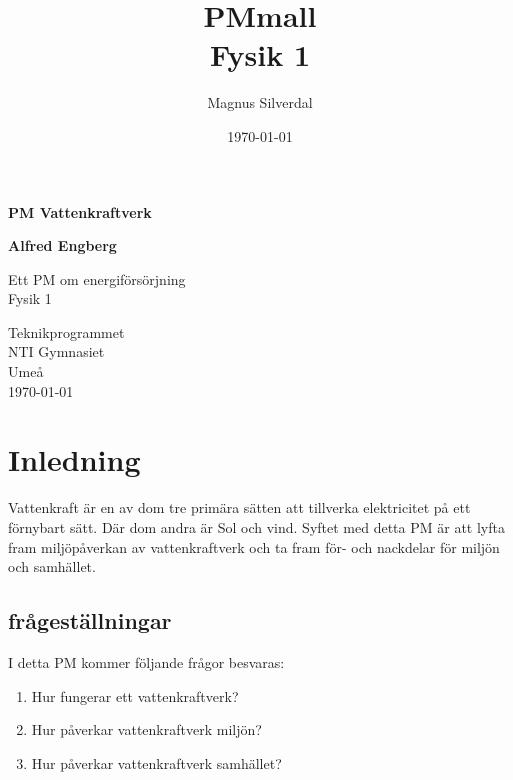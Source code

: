 \documentclass[11p]{article}
\title{PMmall \\ \small Fysik 1}
\author{Magnus Silverdal }
\date{\today}
\begin{document}
    \begin{titlepage}
        \begin{center}
            \vspace*{1cm}

            \Huge
            \textbf{PM Vattenkraftverk}

            \vspace{0.5cm}
            \LARGE


            \vspace{1.5cm}

            \textbf{Alfred Engberg}

            \vfill

            Ett PM om energiförsörjning \\
            Fysik 1

            \vspace{0.8cm}


            \Large
            Teknikprogrammet\\
            NTI Gymnasiet\\
            Umeå\\
            \today

        \end{center}
    \end{titlepage}
    \tableofcontents
    \newpage

    \section{Inledning}
    Vattenkraft är en av dom tre primära sätten att tillverka elektricitet på ett förnybart sätt.
    Där dom andra är Sol och vind.
    Syftet med detta PM är att lyfta fram miljöpåverkan av vattenkraftverk och ta fram för- och nackdelar för miljön och samhället.

    \subsection{frågeställningar}
    I detta PM kommer följande frågor besvaras:
    \begin{enumerate}
        \item Hur fungerar ett vattenkraftverk?
        \item Hur påverkar vattenkraftverk miljön?
        \item Hur påverkar vattenkraftverk samhället?
    \end{enumerate}
\end{document}
